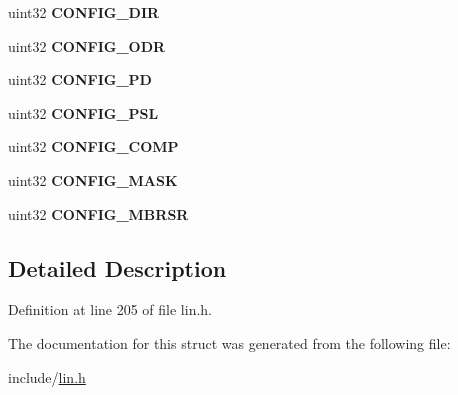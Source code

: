 \begin{DoxyCompactItemize}
\mbox{\label{structlin__config__reg_a692b7a74f7a4ada5012961a974df8b37}} 
uint32 {\bfseries C\+O\+N\+F\+I\+G\+\_\+\+D\+IR}
\item 
\mbox{\label{structlin__config__reg_ad2cdf4e5195b16477c9b567d5e0f2d9f}} 
uint32 {\bfseries C\+O\+N\+F\+I\+G\+\_\+\+O\+DR}
\item 
\mbox{\label{structlin__config__reg_a25573fef952d863a51133b9981c1e5f4}} 
uint32 {\bfseries C\+O\+N\+F\+I\+G\+\_\+\+PD}
\item 
\mbox{\label{structlin__config__reg_a77e2da3786f4e90d970ec5522cf4666d}} 
uint32 {\bfseries C\+O\+N\+F\+I\+G\+\_\+\+P\+SL}
\item 
\mbox{\label{structlin__config__reg_a0a495290fb7e18d895ddbbfd05b5157d}} 
uint32 {\bfseries C\+O\+N\+F\+I\+G\+\_\+\+C\+O\+MP}
\item 
\mbox{\label{structlin__config__reg_a65e40875afa2d72e638c30baa2fa0af2}} 
uint32 {\bfseries C\+O\+N\+F\+I\+G\+\_\+\+M\+A\+SK}
\item 
\mbox{\label{structlin__config__reg_afed38f5b17743e190323b2485430ec10}} 
uint32 {\bfseries C\+O\+N\+F\+I\+G\+\_\+\+M\+B\+R\+SR}
\end{DoxyCompactItemize}


\subsection{Detailed Description}


Definition at line 205 of file lin.\+h.



The documentation for this struct was generated from the following file\+:\begin{DoxyCompactItemize}
\item 
include/\mbox{\hyperlink{lin_8h}{lin.\+h}}\end{DoxyCompactItemize}
